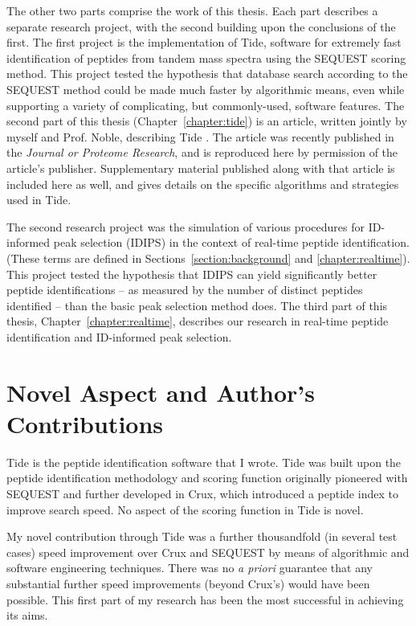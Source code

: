 \documentclass[12pt,twoside,openright]{report}
\begin{document}
The other two parts comprise the work of this thesis. Each part describes a
separate research project, with the second building upon the conclusions of the
first. The first project is the implementation of Tide, software for extremely
fast identification of peptides from tandem mass spectra using the SEQUEST
scoring method. This project tested the hypothesis that database search
according to the SEQUEST method could be made much faster by algorithmic means,
even while supporting a variety of complicating, but commonly-used, software
features. The second part of this thesis (Chapter~\ref{chapter:tide}) is an article, written jointly by myself and
Prof. Noble, describing Tide \cite{diament:faster}. The article was recently
published in the {\it Journal or Proteome Research}, and is reproduced here by
permission of the article's publisher.  Supplementary material published along
with that article is included here as well, and gives details on the specific
algorithms and strategies used in Tide.

The second research project was the simulation of various procedures for
ID-informed peak selection (IDIPS) in the context of real-time peptide
identification. (These terms are defined in Sections~\ref{section:background}
and \ref{chapter:realtime}). This project tested the hypothesis that IDIPS can
yield significantly better peptide identifications -- as measured by the number
of distinct peptides identified -- than the basic peak selection method
does. The third part of this thesis, Chapter~\ref{chapter:realtime}, describes
our research in real-time peptide identification and ID-informed peak selection.

\section{Novel Aspect and Author's Contributions}
\label{section:novelty}

Tide is the peptide identification software that I wrote. Tide was built upon the
peptide identification methodology and scoring function originally pioneered
with SEQUEST and further developed in Crux, which introduced a peptide index to
improve search speed. No aspect of the scoring function in Tide is novel.

My novel contribution through Tide was a further thousandfold (in several test
cases) speed improvement over Crux and SEQUEST by means of algorithmic and
software engineering techniques. There was no {\it a priori} guarantee that any
substantial further speed improvements (beyond Crux's) would have been
possible. This first part of my research has been the most successful in
achieving its aims.
\end{document}
